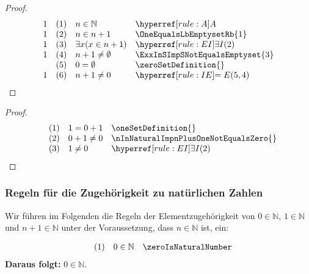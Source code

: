 \documentclass[main.tex]{subfiles}
\begin{document}
\label{nInNaturalImpnPlusOneNotEqualsZero}
\begin{theorem}
\end{theorem}
\begin{proof}
	\[
	\begin{array}{llll}
		  1   & (1) & n\in\mathbb{N} & \rA\\
		1   & (2) & n\in n+1  & \OneEqualsLbEmptysetRb{1}\\
  		1   & (3) & \exists x(x\in n+1)  & \rEI{2}\\
        1   & (4) & n+1\neq \emptyset  & \ExxInSImpSNotEqualsEmptyset{3}\\
            & (5) & 0=\emptyset  & \zeroSetDefinition{}\\
        1   & (6) & n+1\neq 0  & \rIE{5,4}\\
	\end{array}
	\]
\end{proof}

\label{ImpOneNotEqualsZero}
\begin{theorem}
\end{theorem}
\begin{proof}
	\[
	\begin{array}{llll}
		      & (1) & 1=0+1 & \oneSetDefinition{}\\
		    & (2) & 0+1\neq 0  & \nInNaturalImpnPlusOneNotEqualsZero{}\\
  		    & (3) & 1\neq 0  & \rEI{2}\\
	\end{array}
	\]
\end{proof}




\subsubsection{Regeln für die Zugehörigkeit zu natürlichen Zahlen}
\label{rule:zeroIsNaturalNumber} \label{rule:oneIsNaturalNumber} \label{rule:successorIsNaturalNumber}

Wir führen im Folgenden die Regeln der Elementzugehörigkeit von \(0 \in \mathbb{N}\), \(1 \in \mathbb{N}\) und \(n+1 \in \mathbb{N}\) unter der Voraussetzung, dass \(n \in \mathbb{N}\) ist, ein:

\[
\begin{array}{llll}
	& (1) & 0\in\mathbb{N} & \zeroIsNaturalNumber \\
\end{array}
\]
\textbf{Daraus folgt:} \(0 \in \mathbb{N}\).
\end{document}
